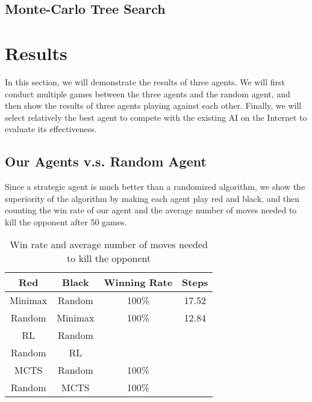 \documentclass[letterpaper]{article}
\begin{document}
\subsection{Monte-Carlo Tree Search}
\label{subsec:monte-carlo-tree-search}



\section{Results}\label{sec:results}
In this section, we will demonstrate the results of three agents.
We will first conduct multiple games between the three agents and the random agent, and then show the results of three agents playing against each other.
Finally, we will select relatively the best agent to compete with the existing AI on the Internet to evaluate its effectiveness.

\subsection{Our Agents v.s. Random Agent}
\label{subsec:our-agents-vs-random-agent}
Since a strategic agent is much better than a randomized algorithm, we show the superiority of the algorithm by making each agent play red and black, and then counting the win rate of our agent and the average number of moves needed to kill the opponent after 50 games.
\begin{table}[htbp]
    \centering
    \caption{Win rate and average number of moves needed to kill the opponent}
    \label{tab:tab1}
    \begin{tabular}{|c|c|c|c|}
        \hline
        Red & Black & Winning Rate & Steps  \\ \hline
        Minimax & Random & 100\% & 17.52 \\ \hline
        Random & Minimax & 100\% & 12.84 \\ \hline
        RL & Random &  &  \\ \hline
        Random & RL &  & \\ \hline
        MCTS & Random & 100\% & \\ \hline
        Random & MCTS & 100\% & \\ \hline
    \end{tabular}
\end{table}
\end{document}
